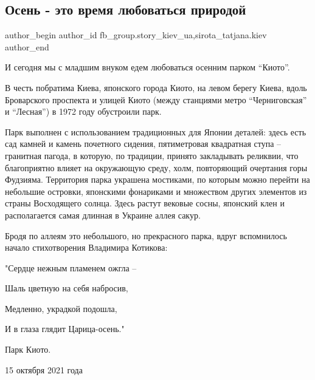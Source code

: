  
 
 
 
 
 
\subsection{Осень - это время  любоваться природой}
\label{sec:16_10_2021.fb.fb_group.story_kiev_ua.2.osenj_park_kioto}
 
\ifcmt
 author_begin
   author_id fb_group.story_kiev_ua,sirota_tatjana.kiev
 author_end
\fi

\begin{multicols}{2} %
\setlength{\parindent}{0pt}


И сегодня мы с младшим внуком едем любоваться осенним парком \enquote{Киото}.

В честь побратима Киева, японского города Киото, на левом берегу Киева, вдоль
Броварского проспекта и улицей Киото (между станциями метро \enquote{Черниговская} и
\enquote{Лесная}) в 1972  году обустроили парк.

Парк выполнен с использованием традиционных для Японии деталей: здесь есть сад
камней и камень почетного сидения, пятиметровая квадратная ступа – гранитная
пагода, в которую, по традиции, принято закладывать реликвии, что благоприятно
влияет на окружающую среду, холм, повторяющий очертания горы Фудзияма.
Территория парка украшена мостиками, по которым можно перейти на небольшие
островки, японскими фонариками и множеством других элементов из страны
Восходящего солнца. Здесь растут вековые сосны, японский клен и располагается
самая длинная в Украине аллея сакур.

Бродя по аллеям это небольшого, но прекрасного парка, вдруг вспомнилось начало
стихотворения Владимира Котикова:

"Сердце нежным пламенем ожгла –

Шаль цветную на себя набросив,

Медленно, украдкой подошла,

И в глаза глядит Царица-осень."

Парк Киото.

15 октября 2021 года 

\end{multicols} %


\begin{multicols}{2} %
\setlength{\parindent}{0pt}

\end{multicols} %
